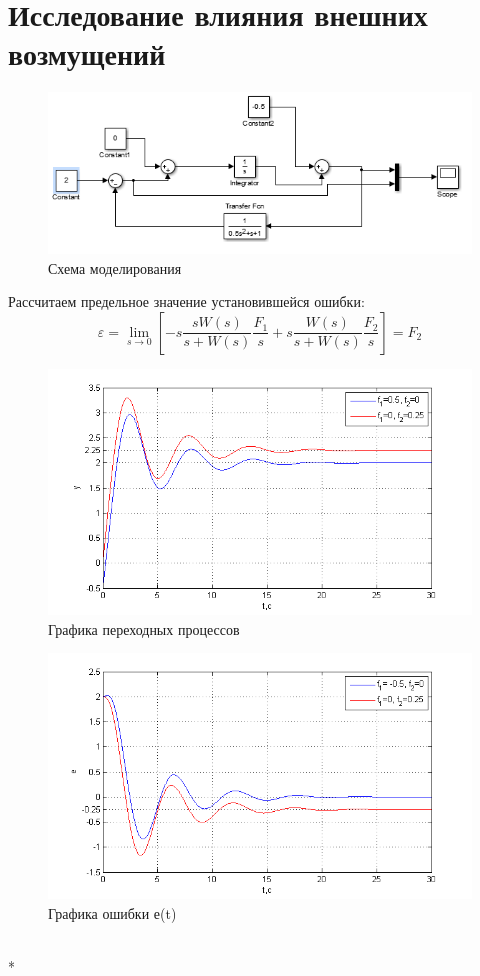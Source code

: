 \documentclass[a4paper, 11pt]{article}
\begin{document}
\section{Исследование влияния внешних возмущений}\hfill\par
\begin{figure}[h]
	\centering
	\includegraphics[width=0.7\linewidth]{9}
	\caption{Схема моделирования}
	\label{fig:9}
\end{figure}
Рассчитаем предельное значение установившейся ошибки:
\begin{equation}
\varepsilon  = \mathop {\lim }\limits_{s \to 0} [ - s\frac{{sW(s)}}{{s + W(s)}}\frac{{{F_1}}}{s} + s\frac{{W(s)}}{{s + W(s)}}\frac{{{F_2}}}{s}] = {F_2}
\end{equation}
\begin{center}
	\begin{figure}[H]
		\centering
			\includegraphics[width=0.7\linewidth]{10}
		\caption{Графика переходных процессов}
		\label{fig:10}
	\end{figure}
\end{center}
\newpage
\begin{figure}[h]
	\centering
	\includegraphics[width=0.7\linewidth]{13}
	\caption{Графика ошибки е(t)}
	\label{fig:13}
\end{figure}
\hfill\\*
\newpage
\end{document}
